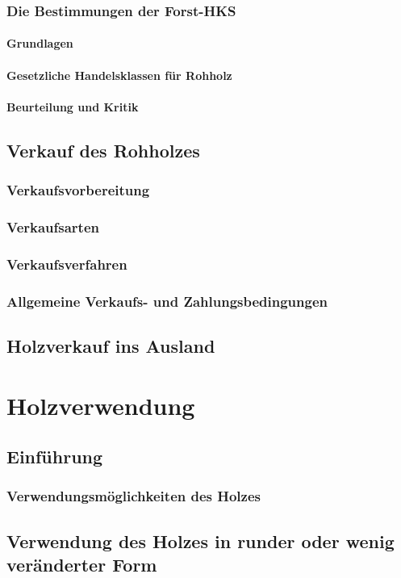 \documentclass[12pt]{article}
\begin{document}
\subsubsection{Die Bestimmungen der Forst-HKS}
\paragraph{Grundlagen}
\paragraph{Gesetzliche Handelsklassen für Rohholz}
\paragraph{Beurteilung und Kritik}
\subsection{Verkauf des Rohholzes}
\subsubsection{Verkaufsvorbereitung}
\subsubsection{Verkaufsarten}
\subsubsection{Verkaufsverfahren}
\subsubsection{Allgemeine Verkaufs- und Zahlungsbedingungen}
\subsection{Holzverkauf ins Ausland}
\section{Holzverwendung}
\subsection{Einführung}
\subsubsection{Verwendungsmöglichkeiten des Holzes}
\subsection{Verwendung des Holzes in runder oder wenig veränderter Form}
\end{document}
